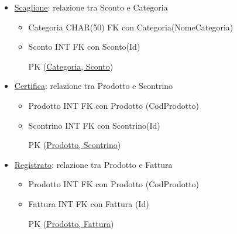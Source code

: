 \begin{itemize}
\item \underline{Scaglione}: relazione tra Sconto e Categoria
  \begin{itemize}

  \item Categoria CHAR(50) FK con Categoria(NomeCategoria)
  \item Sconto INT FK con Sconto(Id)

    PK (\underline{Categoria, Sconto})
    
  \end{itemize}

\item \underline{Certifica}: relazione tra Prodotto e Scontrino
  \begin{itemize}

  \item Prodotto INT FK con Prodotto (CodProdotto)
  \item Scontrino INT FK con Scontrino(Id)

    PK (\underline{Prodotto, Scontrino})

  \end{itemize}

\item \underline{Registrato}: relazione tra Prodotto e Fattura
  \begin{itemize}

  \item Prodotto INT FK con Prodotto (CodProdotto)
  \item Fattura INT FK con Fattura (Id)

    PK (\underline{Prodotto, Fattura})
    
  \end{itemize}
  
\end{itemize}

